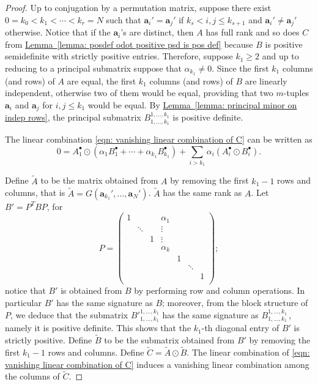 \documentclass[11pt]{article}
\numberwithin{equation}{section}
\theoremstyle{definition}
\theoremstyle{plain}
\newcommand{\expref}[2]{\hyperref[#2]{#1~\ref{#2}}}
\newcommand{\vvirg}{ , \dots , }
\providecommand{\textsum}{}
\renewcommand{\textsum}{{\textstyle \sum}}
\newcommand{\bfa}{\mathbf{a}}
\renewcommand{\tilde}[1]{\widetilde{#1}}
\begin{document}
\begin{proof}
Up to conjugation by a permutation matrix, suppose there exist $0 = k_0 < k_1 < \cdots < k_r=N$ such that $\bfa_i' = \bfa_j'$ if $k_s < i,j \leq k_{s+1}$ and $\bfa_i' \neq \bfa_j'$ otherwise. Notice that if the $\bfa_i$'s are distinct, then $A$ has full rank and so does $C$ from \expref{Lemma}{lemma: posdef odot positive psd is pos def} because $B$ is positive semidefinite with strictly positive entries. Therefore, suppose $k_1 \geq 2$ and up to reducing to a principal submatrix suppose that $\alpha_{k_1} \neq 0$. Since the first $k_1$ columns (and rows) of $A$ are equal, the first $k_1$ columns (and rows) of $B$ are linearly independent, otherwise two of them would be equal, providing that two $m$-tuples $\bfa_i$ and $\bfa_j$ for $i,j \leq k_1$ would be equal. By \expref{Lemma}{lemma: principal minor on indep rows}, the principal submatrix $B^{1\vvirg k_1}_{1 \vvirg k_1}$ is positive definite.

The linear combination \eqref{eqn: vanishing linear combination of C} can be written as 
\[
 0 = A^\bullet_1 \odot(\alpha_1 B^\bullet_1 + \cdots + \alpha_{k_1} B^\bullet_{k_1}) + \textsum_{i > k_1} \alpha_i (A^\bullet_i \odot B^\bullet_i).
\]

Define $\tilde{A}$ to be the matrix obtained from $A$ by removing the first $k_1-1$ rows and columns, that is $\tilde{A} = G(\bfa_{k_1}' \vvirg \bfa_N')$. $\tilde{A}$ has the same rank as $A$. Let $B' = P^T B P$, for
\[
 P = \left( \begin{array}{ccccccc}
              1 & & & \alpha_1& & & \\
              & \ddots & & \vdots & & & \\
              & & 1 & \vdots & & & \\
              & & & \alpha_k& & & \\
              & & & & 1 & & \\
              & & & & & \ddots & \\
              & & & & & & 1\\
            \end{array}
 \right);
\]
notice that $B'$ is obtained from $B$ by performing row and column operations. In particular $B'$ has the same signature as $B$; moreover, from the block structure of $P$, we deduce that the submatrix ${B'}^{1 \vvirg k_1}_ { 1\vvirg k_1}$ has the same signature as $B^{1 \vvirg k_1}_ { 1\vvirg k_1}$\,, namely it is positive definite. This shows that the $k_1$-th diagonal entry of $B'$ is strictly positive. Define $\tilde{B}$ to be the submatrix obtained from $B'$ by removing the first $k_1-1$ rows and columns. Define $\tilde{C} = \tilde{A} \odot \tilde{B}$. The linear combination of \eqref{eqn: vanishing linear combination of C} induces a vanishing linear combination among the columns of $\tilde{C}$. 


\end{proof}
\end{document}
